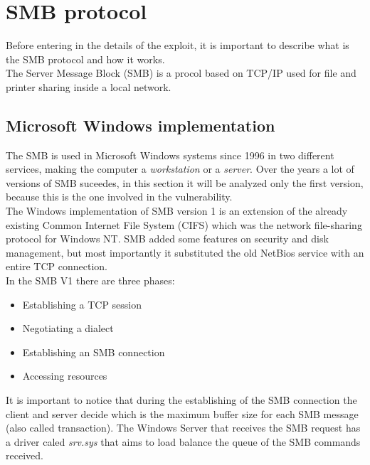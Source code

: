 \section{SMB protocol}
Before entering in the details of the exploit, it is important to describe what is the SMB 
protocol and how it works.\\
The Server Message Block (SMB) is a procol based on TCP/IP used for file and printer sharing 
inside a local network.

\subsection{Microsoft Windows implementation}
The SMB is used in Microsoft Windows systems since 1996 in two different services, making the computer a \textit{workstation}
or a \textit{server}.
Over the years a lot of versions of SMB suceedes, in this section it will be analyzed only the first version, because
this is the one involved in the vulnerability.\\
The Windows implementation of SMB version 1 is an extension of the already existing Common Internet File System (CIFS)
which was the network file-sharing protocol for Windows NT.
SMB added some features on security and disk management, but most importantly it substituted the old NetBios service with an entire 
TCP connection.\\
In the SMB V1 there are three phases\cite{microsoft-smb}:
\begin{itemize}
    \item Establishing a TCP session
    \item Negotiating a dialect
    \item Establishing an SMB connection
    \item Accessing resources
\end{itemize}
It is important to notice that during the establishing of the SMB connection the client and server decide which is the maximum
buffer size for each SMB message (also called transaction).
The Windows Server that receives the SMB request has a driver caled \textit{srv.sys} that aims to load balance the queue of the SMB commands received.

\clearpage

